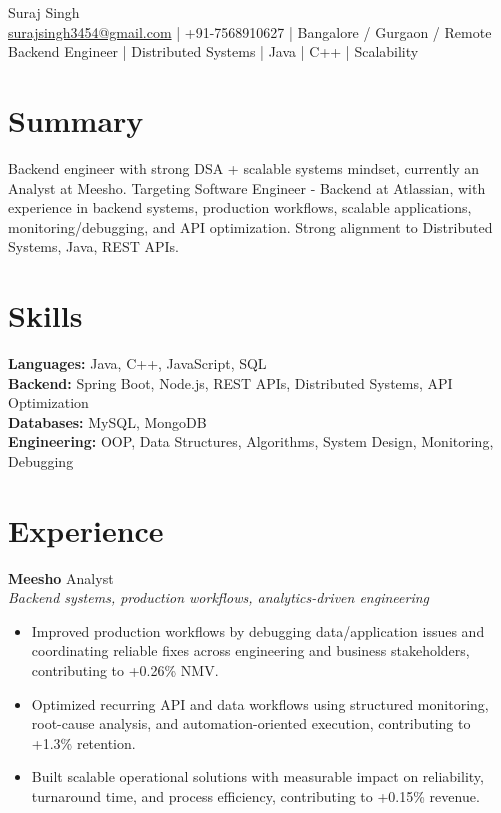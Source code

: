 \documentclass[10pt]{article}
\begin{document}
\begin{center}
{\Large Suraj Singh}\\
\href{mailto:surajsingh3454@gmail.com}{surajsingh3454@gmail.com} \quad | \quad +91-7568910627 \quad | \quad Bangalore / Gurgaon / Remote\\
Backend Engineer | Distributed Systems | Java | C++ | Scalability
\end{center}

\section*{Summary}
Backend engineer with strong DSA + scalable systems mindset, currently an Analyst at Meesho. Targeting Software Engineer - Backend at Atlassian, with experience in backend systems, production workflows, scalable applications, monitoring/debugging, and API optimization. Strong alignment to Distributed Systems, Java, REST APIs.

\section*{Skills}
\textbf{Languages:} Java, C++, JavaScript, SQL\\
\textbf{Backend:} Spring Boot, Node.js, REST APIs, Distributed Systems, API Optimization\\
\textbf{Databases:} MySQL, MongoDB\\
\textbf{Engineering:} OOP, Data Structures, Algorithms, System Design, Monitoring, Debugging

\section*{Experience}
\textbf{Meesho} \hfill Analyst\\
\textit{Backend systems, production workflows, analytics-driven engineering}\\
\begin{itemize}
\item Improved production workflows by debugging data/application issues and coordinating reliable fixes across engineering and business stakeholders, contributing to +0.26\% NMV.
\item Optimized recurring API and data workflows using structured monitoring, root-cause analysis, and automation-oriented execution, contributing to +1.3\% retention.
\item Built scalable operational solutions with measurable impact on reliability, turnaround time, and process efficiency, contributing to +0.15\% revenue.
\end{itemize}
\end{document}

